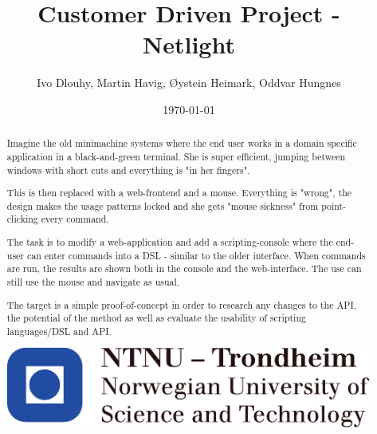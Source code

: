 \documentclass[10pt,a4paper,oneside]{report}
\begin{document}
\title{Customer Driven Project - Netlight}
\author{Ivo Dlouhy, Martin Havig, Øystein Heimark, Oddvar Hungnes}
\date{\today}
\maketitle



\begin{abstract}

Imagine the old minimachine systems where the end user works in a domain specific application in a black-and-green terminal. She is super efficient, jumping between windows with short cuts and everything is "in her fingers".
 
This is then replaced with a web-frontend and a mouse. Everything is "wrong", the design makes the usage patterns locked and she gets "mouse sickness" from point-clicking every command.
 
The task is to modify a web-application and add a scripting-console where the end-user can enter commands into a DSL - similar to the older interface. When commands are run, the results are shown both in the console and the web-interface. The use can still use the mouse and navigate as usual.
 
The target is a simple proof-of-concept in order to research any changes to the API, the potential of the method as well as evaluate the usability of scripting languages/DSL and API.

\includegraphics{image/logo-ntnu.pdf}

\end{abstract}

\setcounter{tocdepth}{4}
\tableofcontents
\clearpage
\listoffigures


\end{document}
